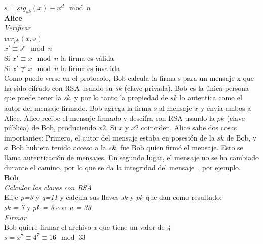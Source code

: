 \textit{$ s = sig_{sk} (x) \equiv x^{d} \mod n $}\\

\textbf{Alice}\\
\textit{Verificar} \\

\textit{$ ver_{pk} (x,s) $}\\ 

\textit{$ x ' \equiv s^{e} \mod n$}\\ 

Si \textit{$ x ' \equiv x \mod n$} la firma es válida\\ 

Si \textit{$ x ' \not\equiv x \mod n$} la firma es invalida\\ 

Como puede verse en el protocolo, Bob calcula la firma s para un mensaje x que ha sido cifrado con RSA usando su $sk$ (clave privada). Bob es la única persona que puede tener la \textit{sk}, y por lo tanto la propiedad de $sk$ lo autentica como el autor del mensaje firmado. Bob agrega la firma $s$ al mensaje $x$ y envía ambos a Alice. Alice recibe el mensaje firmado y descifra con RSA usando la $pk$ (clave pública) de Bob, produciendo $x2$. Si $x$ y $x2$ coinciden, Alice sabe dos cosas importantes: Primero, el autor del mensaje estaba en posesión de la $sk$ de Bob, y si Bob hubiera tenido acceso a la $sk$, fue Bob quien firmó el mensaje. Esto se llama autenticación de mensajes. En segundo lugar, el mensaje no se ha cambiado durante el camino, por lo que se da la integridad del mensaje~\cite{paar}, por ejemplo.\\

\textbf{Bob}\\
\textit{Calcular las claves con RSA} \\

Elije \textit{ p=3 } y\textit{ q=11 } y calcula sus llaves $sk$ y $pk$ que dan como resultado: \\

\textit{ sk = 7 } y \textit{ pk = 3 } con \textit{ n = 33 } \\

\textit{Firmar} \\

Bob quiere firmar el archivo \textit{ x } que tiene un valor de \textit{ 4 }\\

\textit{$ s = x^{7} \equiv 4^{7} \equiv 16 \mod 33 $}\\

